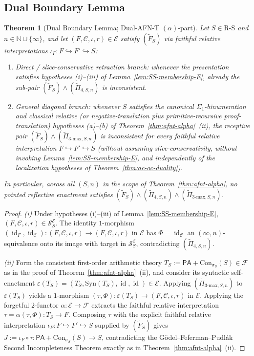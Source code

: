 \documentclass[11pt]{article}
\theoremstyle{plain}
\newtheorem{theorem}{Theorem}[section]
\theoremstyle{definition}
\newcommand{\RS}{\mathrm{R\text{-}S}}
\newcommand{\cS}{\mathcal{S}}
\newcommand{\cF}{\mathcal{F}}
\newcommand{\cC}{\mathcal{C}}
\newcommand{\Syn}{\mathrm{Syn}}
\newcommand{\Con}{\mathrm{Con}}
\newcommand{\PA}{\mathsf{PA}}
\newcommand{\cE}{\mathcal{E}}
\newcommand{\SSE}{\cS_{S}^{\cE}}
\DeclareMathOperator{\id}{id}
\begin{document}
\subsection{Dual Boundary Lemma}

\begin{theorem}[Dual Boundary Lemma; Dual-AFN-T $(\alpha)$-part]\label{thm:dual-afnt}
Let $S \in \RS$ and $n \in \mathbb{N} \cup \{\infty\}$, and let $(F, \cC, \iota, r) \in \cE$ satisfy $(\tilde{F}_S)$ via faithful relative interpretations $\iota_F : F \hookrightarrow F' \hookrightarrow S$:
\begin{enumerate}[nosep,label=(\roman*)]
\item \emph{Direct / slice-conservative retraction branch}: whenever the presentation satisfies hypotheses (i)--(iii) of Lemma~\ref{lem:SS-membership-E}, already the sub-pair $(\tilde{F}_S) \wedge (\tilde{\Pi}_{4, S, n})$ is inconsistent.
\item \emph{General diagonal branch}: whenever $S$ satisfies the canonical $\Sigma_1$-binumeration and classical relative (or negative-translation plus primitive-recursive proof-translation) hypotheses (a)--(b) of Theorem~\ref{thm:afnt-alpha}~(ii), the receptive pair $(\tilde{F}_S) \wedge (\tilde{\Pi}_{3\text{-max}, S, n})$ is inconsistent for \emph{every} faithful relative interpretation $F \hookrightarrow F' \hookrightarrow S$ (without assuming slice-conservativity, without invoking Lemma~\ref{lem:SS-membership-E}, and independently of the localization hypotheses of Theorem~\ref{thm:ac-oc-duality}).
\end{enumerate}
In particular, across all $(S, n)$ in the scope of Theorem~\ref{thm:afnt-alpha}, no pointed reflective enactment satisfies $(\tilde{F}_S) \wedge (\tilde{\Pi}_{4, S, n}) \wedge (\tilde{\Pi}_{3\text{-max}, S, n})$.
\end{theorem}

\begin{proof}
\emph{(i)} Under hypotheses (i)--(iii) of Lemma~\ref{lem:SS-membership-E}, $(F, \cC, \iota, r) \in \SSE$. The identity $1$-morphism $(\id_F, \id_\cC) : (F, \cC, \iota, r) \to (F, \cC, \iota, r)$ in $\cE$ has $\Phi = \id_\cC$ an $(\infty, n)$-equivalence onto its image with target in $\SSE$, contradicting $(\tilde{\Pi}_{4, S, n})$.

\emph{(ii)} Form the consistent first-order arithmetic theory $T_S := \PA + \Con_{\sigma_S}(S) \in \cF$ as in the proof of Theorem~\ref{thm:afnt-alpha}~(ii), and consider its syntactic self-enactment $\varepsilon(T_S) = (T_S, \Syn(T_S), \id, \id) \in \cE$. Applying $(\tilde{\Pi}_{3\text{-max}, S, n})$ to $\varepsilon(T_S)$ yields a $1$-morphism $(\tau, \Phi) : \varepsilon(T_S) \to (F, \cC, \iota, r)$ in $\cE$. Applying the forgetful $2$-functor $\alpha : \cE \to \cF$ extracts the faithful relative interpretation $\tau = \alpha(\tau, \Phi) : T_S \to F$. Composing $\tau$ with the explicit faithful relative interpretation $\iota_F : F \hookrightarrow F' \hookrightarrow S$ supplied by $(\tilde{F}_S)$ gives $J := \iota_F \circ \tau : \PA + \Con_{\sigma_S}(S) \to S$, contradicting the G\"odel--Feferman--Pudl\'ak Second Incompleteness Theorem exactly as in Theorem~\ref{thm:afnt-alpha}~(ii).
\end{proof}
\end{document}
